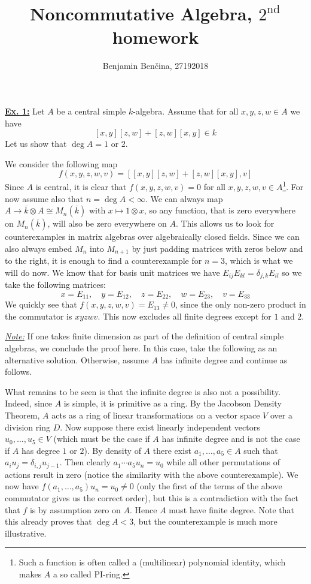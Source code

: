 \documentclass[a4paper, 12pt]{article}
\title{Noncommutative Algebra, $2^\text{nd}$ homework}
\author{Benjamin Benčina, 27192018}
\newcommand{\iso}{\cong}
\begin{document}
\maketitle

\underline{\textbf{Ex. 1:}}
Let $A$ be a central simple $k$-algebra. Assume that for all $x, y, z, w \in A$ we have
\[
    [x, y][z,w] + [z, w][x, y] \in k
\]
Let us show that $\deg{A} = 1$ or $2$.

We consider the following map
\[
    f(x, y, z, w, v) = [[x, y][z, w] + [z, w][x, y], v]
\]
Since $A$ is central, it is clear that $f(x, y, z, w, v) = 0$ for all $x, y, z, w, v \in A$\footnote{Such a function is often called a (multilinear) polynomial identity, which makes $A$ a so called PI-ring.}.
For now assume also that $n = \deg A < \infty$.
We can always map $A \to \overline{k} \otimes A \iso M_n(\overline{k})$ with $x \mapsto 1 \otimes x$, so any function, that is zero everywhere on $M_n(\overline{k})$, will also be zero everywhere on $A$.
This allows us to look for counterexamples in matrix algebras over algebraically closed fields.
Since we can also always embed $M_n$ into $M_{n+1}$ by just padding matrices with zeros below and to the right, it is enough to find a counterexample for $n = 3$, which is what we will do now.
We know that for basis unit matrices we have $E_{ij}E_{kl} = \delta_{j,k}E_{il}$ so we take the following matrices:
\[
    x = E_{11},\quad y = E_{12},\quad z = E_{22},\quad w = E_{23},\quad v = E_{33}
\]
We quickly see that $f(x, y, z, w, v) = E_{13} \neq 0$, since the only non-zero product in the commutator is $xyzwv$.
This now excludes all finite degrees except for $1$ and $2$.

\underline{\textit{Note:}}
If one takes finite dimension as part of the definition of central simple algebras, we conclude the proof here.
In this case, take the following as an alternative solution. Otherwise, assume $A$ has infinite degree and continue as follows.

What remains to be seen is that the infinite degree is also not a possibility.
Indeed, since $A$ is simple, it is primitive as a ring.
By the Jacobson Density Theorem, $A$ acts as a ring of linear transformations on a vector space $V$ over a division ring $D$.
Now suppose there exist linearly independent vectors $u_0, \dots, u_5 \in V$ (which must be the case if $A$ has infinite degree and is not the case if $A$ has degree $1$ or $2$).
By density of $A$ there exist $a_1, \dots, a_5 \in A$ such that $a_iu_j = \delta_{i,j}u_{j-1}$.
Then clearly $a_1\cdots a_5 u_n = u_0$ while all other permutations of actions result in zero (notice the similarity with the above counterexample).
We now have $f(a_1,\dots,a_5)u_n = u_0 \neq 0$ (only the first of the terms of the above commutator gives us the correct order), but this is a contradiction with the fact that $f$ is by assumption zero on $A$.
Hence $A$ must have finite degree.
Note that this already proves that $\deg A < 3$, but the counterexample is much more illustrative.
\newline
\end{document}
